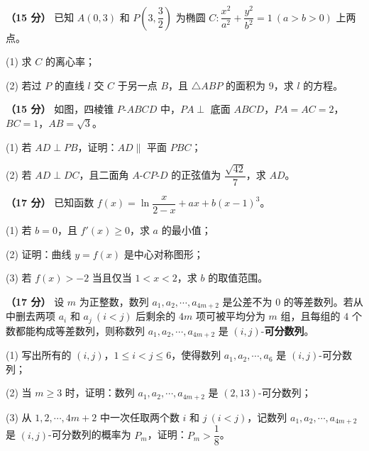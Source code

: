 \textbf{（15 分）} 已知 $A(0,3)$ 和 $P\left(3,\dfrac32\right)$ 为椭圆 $C:\dfrac{x^{2}}{a^{2}}+\dfrac{y^{2}}{b^{2}}=1\ (a>b>0)$ 上两点。

  (1) 求 $C$ 的离心率；

  (2) 若过 $P$ 的直线 $l$ 交 $C$ 于另一点 $B$，且 $\triangle ABP$ 的面积为 $9$，求 $l$ 的方程。

\textbf{（15 分）} 如图，四棱锥 $P\text{-}ABCD$ 中，$PA\perp$ 底面 $ABCD$，$PA=AC=2$，$BC=1$，$AB=\sqrt3$。

\begin{center}\end{center}

  (1) 若 $AD\perp PB$，证明：$AD\parallel$ 平面 $PBC$；

  (2) 若 $AD\perp DC$，且二面角 $A\text{-}CP\text{-}D$ 的正弦值为 $\dfrac{\sqrt{42}}{7}$，求 $AD$。

\textbf{（17 分）} 已知函数 $f(x)=\ln\dfrac{x}{2-x}+ax+b(x-1)^{3}$。

  (1) 若 $b=0$，且 $f'(x)\ge0$，求 $a$ 的最小值；

  (2) 证明：曲线 $y=f(x)$ 是中心对称图形；

  (3) 若 $f(x)>-2$ 当且仅当 $1<x<2$，求 $b$ 的取值范围。

\textbf{（17 分）} 设 $m$ 为正整数，数列 $a_1,a_2,\cdots,a_{4m+2}$ 是公差不为 $0$ 的等差数列。若从中删去两项 $a_i$ 和 $a_j\ (i<j)$ 后剩余的 $4m$ 项可被平均分为 $m$ 组，且每组的 $4$ 个数都能构成等差数列，则称数列 $a_1,a_2,\cdots,a_{4m+2}$ 是 $(i,j)$-\textbf{可分数列}。

  (1) 写出所有的 $(i,j)$，$1\le i<j\le6$，使得数列 $a_1,a_2,\cdots,a_6$ 是 $(i,j)$-可分数列；

  (2) 当 $m\ge3$ 时，证明：数列 $a_1,a_2,\cdots,a_{4m+2}$ 是 $(2,13)$-可分数列；

  (3) 从 $1,2,\cdots,4m+2$ 中一次任取两个数 $i$ 和 $j\ (i<j)$，记数列 $a_1,a_2,\cdots,a_{4m+2}$ 是 $(i,j)$-可分数列的概率为 $P_m$，证明：$P_m>\dfrac18$。

\par\medskip

